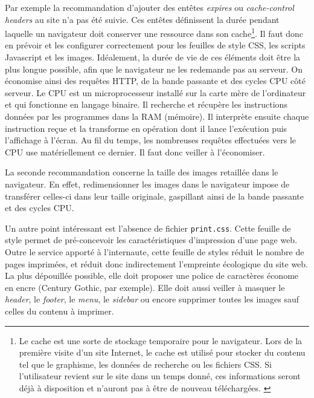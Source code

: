\documentclass[a4paper,12pt,twoside]{book}
\begin{document}
Par exemple la recommandation d'ajouter des entêtes \textit{expires} ou \textit{cache-control headers} au site n'a pas été suivie. Ces entêtes définissent la durée pendant laquelle un navigateur doit conserver une ressource dans son cache\footnote{Le cache est une sorte de stockage temporaire pour le navigateur. Lors de la première visite d'un site Internet, le cache est utilisé pour stocker du contenu tel que le graphisme, les données de recherche ou les fichiers CSS. Si l'utilisateur revient sur le site dans un temps donné, ces informations seront déjà à disposition et n'auront pas à être de nouveau téléchargées. \cite{cache}}. Il faut donc en prévoir et les configurer correctement pour les feuilles de style \acrshort{CSS}, les scripts Javascript et les images. Idéalement, la durée de vie de ces éléments doit être la plus longue possible, afin que le navigateur ne les redemande pas au serveur. On économise ainsi des requêtes HTTP, de la bande passante et des cycles \acrshort{CPU} côté serveur. Le \acrshort{CPU} est un microprocesseur installé sur la carte mère de l'ordinateur et qui fonctionne en langage binaire. Il recherche et récupère les instructions données par les programmes dans la RAM (mémoire). Il interprète ensuite chaque instruction reçue et la transforme en opération dont il lance l'exécution puis l'affichage à l'écran. Au fil du temps, les nombreuses requêtes effectuées vers le \acrshort{CPU} use matériellement ce dernier. Il faut donc veiller à l'économiser. 

La seconde recommandation concerne la taille des images retaillée dans le navigateur. En effet, redimensionner les images dans le navigateur impose de transférer celles-ci dans leur taille originale, gaspillant ainsi de la bande passante et des cycles \acrfull{CPU}. 

Un autre point intéressant est l'absence de fichier \texttt{print.css}. Cette feuille de style permet de pré-concevoir les caractéristiques d'impression d'une page web. Outre le service apporté à l'internaute, cette feuille de styles réduit le nombre de pages imprimées, et réduit donc indirectement l'empreinte écologique du site web. La plus dépouillée possible, elle doit proposer une police de caractères économe en encre (Century Gothic, par exemple). Elle doit aussi veiller à masquer le \textit{header}, le \textit{footer}, le \textit{menu}, le \textit{sidebar} ou encore supprimer toutes les images sauf celles du contenu à imprimer.
\end{document}
